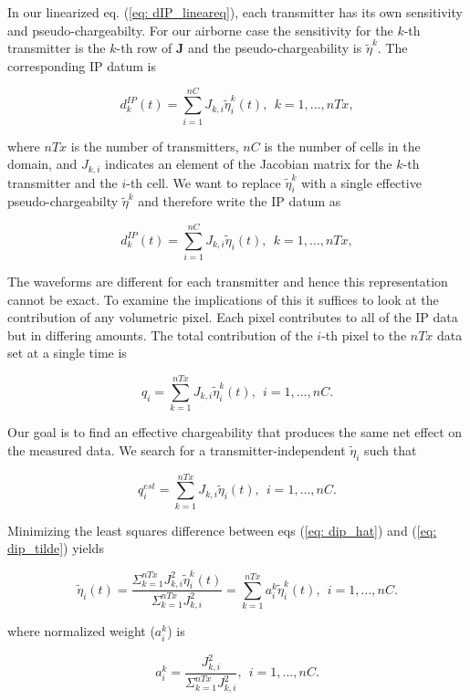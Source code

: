 \documentclass[extra,mreferee]{gji}
\newcommand{\peta}{\tilde{\eta}}
\newcommand{\dip}{d^{IP}}
\begin{document}
In our linearized eq. (\ref{eq: dIP_lineareq}), each transmitter has its own sensitivity and pseudo-chargeabilty. For our airborne case the sensitivity for the $k$-th transmitter is the $k$-th row of $\mathbf{J}$ and the pseudo-chargeability is $\peta^k$. The corresponding  IP datum is 
\begin{linenomath*}
\begin{equation}
  \dip_k(t) = \sum_{i=1}^{nC}J_{k,i}\peta^k_i (t), \ \ k=1, \ldots, nTx,
  \label{eq: dip_kthTx}
\end{equation}
\end{linenomath*}
where $nTx$ is the number of transmitters, $nC$ is the number of cells in the domain, and $J_{k,i}$ indicates an element of the Jacobian matrix for the $k$-th transmitter and the $i$-th cell. We want to replace $\peta^k_i$ with a single effective pseudo-chargeabilty $\peta^k$ and therefore write the IP datum as 
\begin{linenomath*}
\begin{equation}
  \dip_k(t) = \sum_{i=1}^{nC}J_{k,i}\peta_i (t), \ \ k=1, \ldots, nTx,
  \label{eq: dipeff_kthTx}
\end{equation}
\end{linenomath*}
The waveforms are different for each transmitter and hence this representation cannot be exact. To examine the implications of this it suffices to look at the contribution of any volumetric pixel. Each pixel contributes to all of the IP data but in differing amounts. The total contribution of the  $i$-th pixel to the $nTx$ data set at a single time is  
\begin{linenomath*}
\begin{equation}
  q_i =\sum_{k=1}^{nTx} J_{k,i} \peta^k_i(t), \ \ i=1, \ldots, nC.
  \label{eq: dip_hat}
\end{equation}
\end{linenomath*}
Our goal is to find an effective chargeability that produces the same net effect on the measured data. We search for a transmitter-independent $\peta_i$ such that 
\begin{linenomath*}
\begin{equation}
  q_i^{est} =\sum_{k=1}^{nTx} J_{k,i} \peta_i(t), \ \ i=1, \ldots, nC.
  \label{eq: dip_tilde}
\end{equation}
\end{linenomath*}
Minimizing the least squares difference between eqs (\ref{eq: dip_hat}) and (\ref{eq: dip_tilde}) yields
\begin{linenomath*}
\begin{equation}
  \peta_i(t) = \frac {\Sigma_{k=1}^{nTx} J_{k,i}^2\peta^k_i(t)} {\Sigma_{k=1}^{nTx} J_{k,i}^2} = \sum_{k=1}^{nTx} a^k_i \peta^k_i(t), \ \ i=1, \ldots, nC.
  \label{eq: petaeff}
\end{equation}
\end{linenomath*}
where normalized weight ($a^k_i$) is 
\begin{linenomath*}
\begin{equation}
  a^k_i = \frac {J^2_{k,i}} {\Sigma_{k=1}^{nTx} J^2_{k,i}}, \ \ i=1, \ldots, nC.
  \label{eq: normalized_weights}
\end{equation}
\end{linenomath*}
\end{document}
